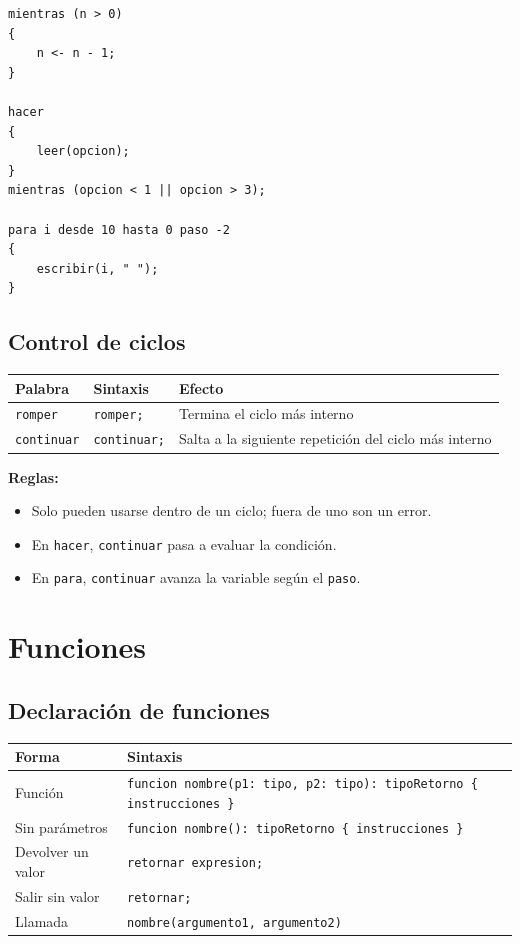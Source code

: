 \documentclass[spanish,11pt,letterpaper]{article}
\begin{document}
	\begin{lstlisting}
mientras (n > 0)
{
	n <- n - 1;
}

hacer
{
	leer(opcion);
}
mientras (opcion < 1 || opcion > 3);

para i desde 10 hasta 0 paso -2
{
	escribir(i, " ");
}
	\end{lstlisting}
	
	
	\subsection{Control de ciclos}
	\begin{center}
		\begin{tabular}{@{}lll@{}}
			\toprule
			\textbf{Palabra} & \textbf{Sintaxis} & \textbf{Efecto} \\
			\midrule
			\texttt{romper} & \texttt{romper;} & Termina el ciclo m\'as interno \\
			\texttt{continuar} & \texttt{continuar;} & Salta a la siguiente repetici\'on del ciclo m\'as interno \\
			\bottomrule
		\end{tabular}
	\end{center}
	
	\textbf{Reglas:}
	\begin{itemize}
		\item Solo pueden usarse dentro de un ciclo; fuera de uno son un error.
		\item En \texttt{hacer}, \texttt{continuar} pasa a evaluar la condici\'on.
		\item En \texttt{para}, \texttt{continuar} avanza la variable seg\'un el
		\texttt{paso}.
	\end{itemize}
	
	\newpage
	
	\section{Funciones}
	\subsection{Declaraci\'on de funciones}
	\begin{center}
		\begin{tabular}{@{}ll@{}}
			\toprule
			\textbf{Forma} & \textbf{Sintaxis} \\
			\midrule
			Funci\'on & \texttt{funcion nombre(p1: tipo, p2: tipo): tipoRetorno \{ instrucciones \}} \\
			Sin par\'ametros & \texttt{funcion nombre(): tipoRetorno \{ instrucciones \}} \\
			Devolver un valor & \texttt{retornar expresion;} \\
			Salir sin valor & \texttt{retornar;} \\
			Llamada & \texttt{nombre(argumento1, argumento2)} \\
			\bottomrule
		\end{tabular}
	\end{center}
	
\end{document}
